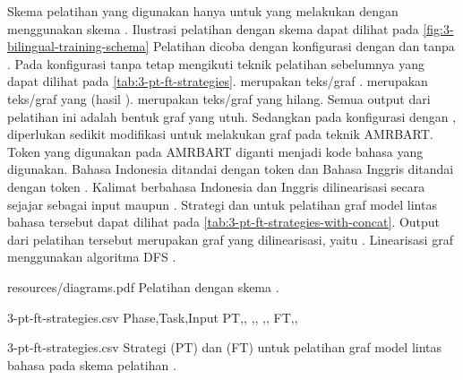 Skema pelatihan yang digunakan hanya untuk yang melakukan \amrparsing{} dengan menggunakan skema .
Ilustrasi pelatihan dengan skema  dapat dilihat pada \cref{fig:3-bilingual-training-schema}
Pelatihan dicoba dengan konfigurasi dengan dan tanpa .
Pada konfigurasi tanpa  tetap mengikuti teknik pelatihan sebelumnya yang dapat dilihat pada \cref{tab:3-pt-ft-strategies}.
 merupakan teks/graf .
 merupakan teks/graf yang  (hasil \denoising{}).
 merupakan teks/graf yang hilang.
Semua output dari pelatihan ini adalah bentuk graf yang utuh.
Sedangkan pada konfigurasi dengan , diperlukan sedikit modifikasi untuk melakukan \pretraining{} graf pada teknik \gls{AMRBART}.
Token  yang digunakan pada \gls{AMRBART} diganti menjadi kode bahasa yang digunakan.
Bahasa Indonesia ditandai dengan token  dan Bahasa Inggris ditandai dengan token .
Kalimat berbahasa Indonesia dan Inggris dilinearisasi secara sejajar sebagai input \pretraining{} maupun \finetuning{}.
Strategi \pretraining{} dan \finetuning{} untuk pelatihan graf model \amrparsing{} lintas bahasa tersebut dapat dilihat pada \cref{tab:3-pt-ft-strategies-with-concat}.
Output dari pelatihan tersebut merupakan graf \AMR{} yang dilinearisasi, yaitu .
Linearisasi graf menggunakan algoritma \gls{DFS} .

  {resources/diagrams.pdf}
  {Pelatihan dengan skema .}

\begin{filecontents*}{3-pt-ft-strategies.csv}
Phase,Task,Input
PT,,\makecell[cl]{\sTagged{[mask]}\graphMasked{}}
,,
,,
FT,,
\end{filecontents*}
  {3-pt-ft-strategies.csv}
  {Strategi \pretraining{} (PT) dan \finetuning{} (FT) untuk pelatihan graf model \amrparsing{} lintas bahasa pada skema pelatihan .}


